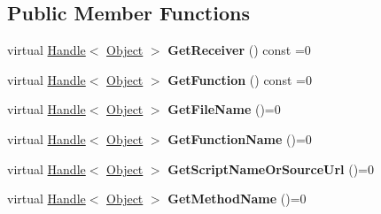 \subsection*{Public Member Functions}
\begin{DoxyCompactItemize}
\item 
\mbox{\label{classv8_1_1internal_1_1StackFrameBase_a186c97e6a350d51023d84772b9833117}} 
virtual \mbox{\hyperlink{classv8_1_1internal_1_1Handle}{Handle}}$<$ \mbox{\hyperlink{classv8_1_1internal_1_1Object}{Object}} $>$ {\bfseries Get\+Receiver} () const =0
\item 
\mbox{\label{classv8_1_1internal_1_1StackFrameBase_a26804e37c30ac791bbc407e4c144a602}} 
virtual \mbox{\hyperlink{classv8_1_1internal_1_1Handle}{Handle}}$<$ \mbox{\hyperlink{classv8_1_1internal_1_1Object}{Object}} $>$ {\bfseries Get\+Function} () const =0
\item 
\mbox{\label{classv8_1_1internal_1_1StackFrameBase_a333d07b14265b0f384c6b60d597e0a21}} 
virtual \mbox{\hyperlink{classv8_1_1internal_1_1Handle}{Handle}}$<$ \mbox{\hyperlink{classv8_1_1internal_1_1Object}{Object}} $>$ {\bfseries Get\+File\+Name} ()=0
\item 
\mbox{\label{classv8_1_1internal_1_1StackFrameBase_a1a8f25f4bddd0fb60ad204aa809ddbea}} 
virtual \mbox{\hyperlink{classv8_1_1internal_1_1Handle}{Handle}}$<$ \mbox{\hyperlink{classv8_1_1internal_1_1Object}{Object}} $>$ {\bfseries Get\+Function\+Name} ()=0
\item 
\mbox{\label{classv8_1_1internal_1_1StackFrameBase_a360b791403d1077400543cfc33e7f5e2}} 
virtual \mbox{\hyperlink{classv8_1_1internal_1_1Handle}{Handle}}$<$ \mbox{\hyperlink{classv8_1_1internal_1_1Object}{Object}} $>$ {\bfseries Get\+Script\+Name\+Or\+Source\+Url} ()=0
\item 
\mbox{\label{classv8_1_1internal_1_1StackFrameBase_aace11d354bd13976a46a621fb84012a9}} 
virtual \mbox{\hyperlink{classv8_1_1internal_1_1Handle}{Handle}}$<$ \mbox{\hyperlink{classv8_1_1internal_1_1Object}{Object}} $>$ {\bfseries Get\+Method\+Name} ()=0
\item 

\end{DoxyCompactItemize}
